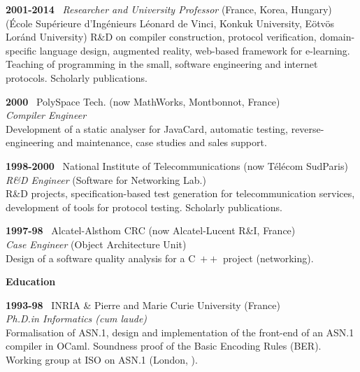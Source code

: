\documentclass[a4paper,11pt]{article}
\newcommand{\cpp}{\mbox{C \hspace*{-2.5mm} \raise 0.7mm \hbox{${\scriptscriptstyle ++}$}}}
\begin{document}
\bigskip

\noindent\textbf{2001-2014} \ \textsf{\emph{Researcher and University
  Professor}} (France, Korea, Hungary)\\ (\textsf{\'Ecole Sup\'erieure
  d'Ing\'enieurs L\'eonard de Vinci}, \textsf{Konkuk University},
\textsf{E\"otv\"os Lor\'and University}) R\&D on compiler
construction, protocol verification, domain\hyp{}specific language
design, augmented reality, web-based framework for
e-learning. Teaching of programming in the small, software engineering
and internet protocols. Scholarly publications.

\bigskip

\noindent\textbf{2000} \ \textsf{PolySpace Tech.\@} (now MathWorks,
Montbonnot, France)\\ \emph{Compiler Engineer}\\ Development of a static
analyser for JavaCard, automatic testing, reverse\hyp{}engineering and
maintenance, case studies and sales support.

\bigskip

\noindent\textbf{1998-2000} \ \textsf{National Institute of
  Telecommunications} (now T\'el\'ecom SudParis)\\ \emph{R\&D
  Engineer} (Software for Networking Lab.)\\ R\&D projects,
specification-based test generation for telecommunication services,
development of tools for protocol testing. Scholarly publications.

\bigskip

\noindent\textbf{1997-98} \ \textsf{Alcatel-Alsthom CRC} (now
Alcatel-Lucent R\&I, France)\\ \emph{Case Engineer} (Object
Architecture Unit)\\ Design of a software quality analysis for a
\cpp{} project (networking).

\bigskip
\noindent\textbf{\large Education}
\bigskip

\noindent\textbf{1993-98} \ \textsf{INRIA \& Pierre and Marie Curie
  University} (France)\\ \emph{Ph.D.\@ in Informatics (cum
laude)}\\ Formalisation of ASN.1, design and implementation of the
front-end of an ASN.1 compiler in OCaml. Soundness proof of the Basic
Encoding Rules (BER). Working group at ISO on ASN.1 (London,
).
\end{document}
